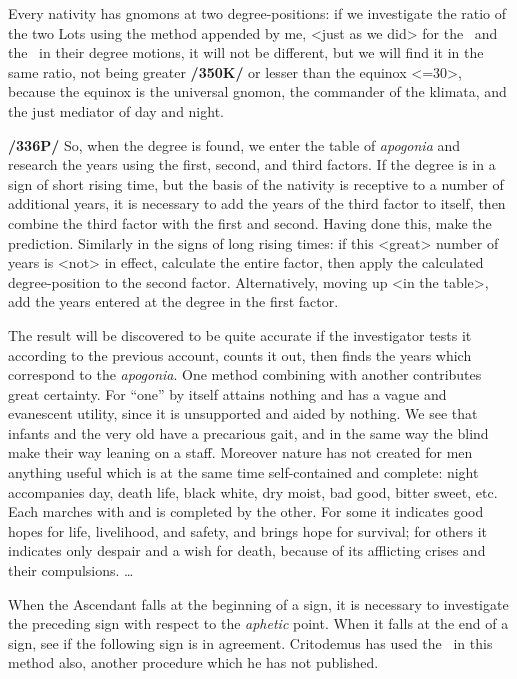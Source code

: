 Every nativity has gnomons at two degree-positions: if we investigate the ratio of the two Lots using the method appended by me, <just as we did> for the \Sun\, and the \Moon\, in their degree motions, it will not be different, but we will find it in the same ratio, not being greater \textbf{/350K/} or lesser than the equinox <=30>, because the equinox is the universal gnomon, the commander of the klimata, and the just mediator of day and night.

\textbf{/336P/} So, when the degree is found, we enter the table of \textit{apogonia} and research the years using the first, second, and third factors. If the degree is in a sign of short rising time, but the basis of the nativity is receptive to a number of additional years, it is necessary to add the years of the third factor to itself, then combine the third factor with the first and second. Having done this, make the prediction. Similarly in the signs of long rising times: if this <great> number of years is <not> in effect, calculate the entire factor, then apply the calculated degree-position to the second factor. Alternatively, moving up <in the table>, add the years entered at the degree in the first factor.

The result will be discovered to be quite accurate if the investigator tests it according to the previous account, counts it out, then finds the years which correspond to the \textit{apogonia}. One method combining with another contributes great certainty. For “one” by itself attains nothing and has a vague and evanescent utility, since it is unsupported and aided by nothing. We see that infants and the very old have a precarious gait, and in the same way the blind make their way leaning on a staff. Moreover nature has not created for men anything useful which is at the same time self-contained and complete: night accompanies day, death life, black white, dry moist, bad good, bitter sweet, etc. Each marches with and is completed by the other. For some it indicates good hopes for life, livelihood, and safety, and brings hope for survival; for others it indicates only despair and a wish for death, because of its afflicting crises and their compulsions.
…

When the Ascendant falls at the beginning of a sign, it is necessary to investigate the preceding sign with respect to the \textit{aphetic} point. When it falls at the end of a sign, see if the following sign is in agreement. Critodemus has used the \Sun\, in this method also, another procedure which he has not published.


\newpage